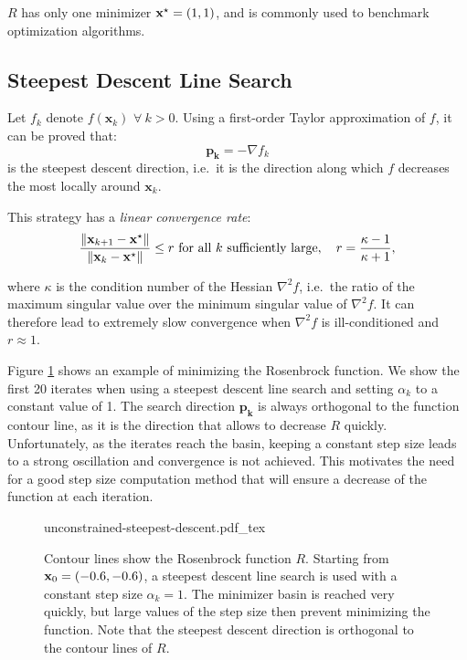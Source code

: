 $R$ has only one minimizer $\mathbf{x}^{\star} = (1,1)$, and is commonly used
to benchmark optimization algorithms.

\subsection{Steepest Descent Line Search}

Let $f_k$ denote $f(\mathbf{x}_k)$ $\forall~k > 0$. Using a
first-order Taylor approximation of $f$, it can be proved that:
\begin{equation}
\mathbf{p_k} = -\nabla f_k
\end{equation}
\noindent is the steepest descent direction, i.e.\ it is the direction along
which $f$ decreases the most locally around $\mathbf{x}_k$.

This strategy has a \emph{linear convergence rate}:
\begin{equation}
\frac{\left\lVert \mathbf{x}_{k+1}-\mathbf{x}^{\star} \right\rVert}{\left\lVert \mathbf{x}_k-\mathbf{x}^{\star} \right\rVert}
\le r \text{ for all } k \text{ sufficiently large}, \quad
r=\frac{\kappa-1}{\kappa+1},
\end{equation}

\noindent where $\kappa$ is the condition number of the Hessian
$\nabla^2 f$, i.e.\ the ratio of the maximum singular value over the
minimum singular value of $\nabla^2 f$.  It can therefore lead to
extremely slow convergence when $\nabla^2 f$ is ill-conditioned and $r
\approx 1$.

Figure \ref{fig:chap3-unconstrained-steepest-descent} shows an example
of minimizing the Rosenbrock function. We show the first 20 iterates
when using a steepest descent line search and setting $\alpha_k$ to a
constant value of 1. The search direction $\mathbf{p_k}$ is always
orthogonal to the function contour line, as it is the direction that
allows to decrease $R$ quickly. Unfortunately, as the iterates reach
the basin, keeping a constant step size leads to a strong oscillation
and convergence is not achieved. This motivates the need for a good
step size computation method that will ensure a decrease of the
function at each iteration.

\begin{figure}
  \centering
      {\def\svgwidth{0.8\linewidth}
        {\footnotesize
          
                     {unconstrained-steepest-descent.pdf_tex}
        }
      }
      \caption[Steepest descent line search.]{Contour lines show the
        Rosenbrock function $R$. Starting from
        $\mathbf{x}_0=(-0.6,-0.6)$, a steepest descent line search is
        used with a constant step size $\alpha_k=1$. The minimizer
        basin is reached very quickly, but large values of the step
        size then prevent minimizing the function. Note that the
        steepest descent direction is orthogonal to the contour lines
        of $R$.}
      \label{fig:chap3-unconstrained-steepest-descent}
\end{figure}


